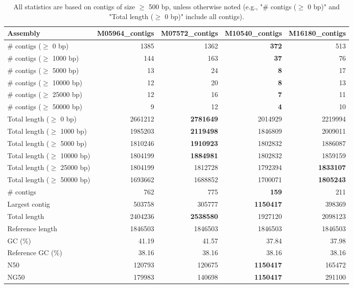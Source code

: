 \documentclass[12pt,a4paper]{article}
\begin{document}
\begin{table}[ht]
\begin{center}
\caption{All statistics are based on contigs of size $\geq$ 500 bp, unless otherwise noted (e.g., "\# contigs ($\geq$ 0 bp)" and "Total length ($\geq$ 0 bp)" include all contigs).}
\begin{tabular}{|l*{4}{|r}|}
\hline
Assembly & M05964\_contigs & M07572\_contigs & M10540\_contigs & M16180\_contigs \\ \hline
\# contigs ($\geq$ 0 bp) & 1385 & 1362 & {\bf 372} & 513 \\ \hline
\# contigs ($\geq$ 1000 bp) & 144 & 163 & {\bf 37} & 76 \\ \hline
\# contigs ($\geq$ 5000 bp) & 13 & 24 & {\bf 8} & 17 \\ \hline
\# contigs ($\geq$ 10000 bp) & 12 & 20 & {\bf 8} & 13 \\ \hline
\# contigs ($\geq$ 25000 bp) & 12 & 16 & {\bf 7} & 11 \\ \hline
\# contigs ($\geq$ 50000 bp) & 9 & 12 & {\bf 4} & 10 \\ \hline
Total length ($\geq$ 0 bp) & 2661212 & {\bf 2781649} & 2014929 & 2219994 \\ \hline
Total length ($\geq$ 1000 bp) & 1985203 & {\bf 2119498} & 1846809 & 2009011 \\ \hline
Total length ($\geq$ 5000 bp) & 1810246 & {\bf 1910923} & 1802832 & 1886087 \\ \hline
Total length ($\geq$ 10000 bp) & 1804199 & {\bf 1884981} & 1802832 & 1859159 \\ \hline
Total length ($\geq$ 25000 bp) & 1804199 & 1812728 & 1792394 & {\bf 1833107} \\ \hline
Total length ($\geq$ 50000 bp) & 1693662 & 1688852 & 1700071 & {\bf 1805243} \\ \hline
\# contigs & 762 & 775 & {\bf 159} & 211 \\ \hline
Largest contig & 503758 & 305777 & {\bf 1150417} & 398369 \\ \hline
Total length & 2404236 & {\bf 2538580} & 1927120 & 2098123 \\ \hline
Reference length & 1846503 & 1846503 & 1846503 & 1846503 \\ \hline
GC (\%) & 41.19 & 41.57 & 37.84 & 37.98 \\ \hline
Reference GC (\%) & 38.16 & 38.16 & 38.16 & 38.16 \\ \hline
N50 & 120793 & 120675 & {\bf 1150417} & 165472 \\ \hline
NG50 & 179983 & 140698 & {\bf 1150417} & 291100 \\ \hline

\end{tabular}
\end{center}
\end{table}
\end{document}
